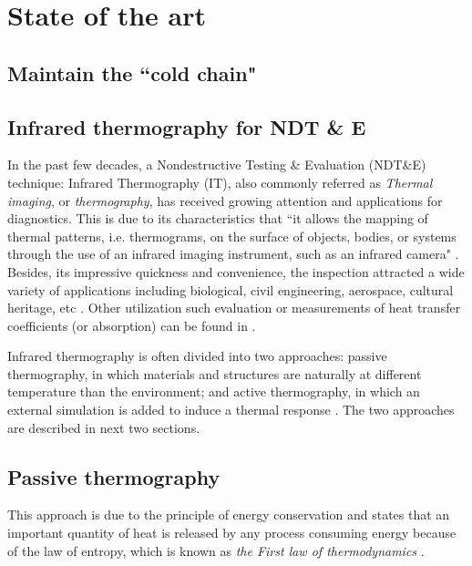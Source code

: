 \chapter{State of the art}     %
\section*{Maintain the ``cold chain"}


\section*{Infrared thermography for NDT \& E}

In the past few decades, a Nondestructive Testing \& Evaluation (NDT\&E) technique: Infrared Thermography (IT), also commonly referred as \textit{Thermal imaging}, or \textit{thermography}, has received growing attention and applications for diagnostics. This is due to its characteristics that ``it allows the mapping of thermal patterns, i.e. thermograms, on the surface of objects, bodies, or systems through the use of an infrared imaging instrument, such as an infrared camera" \citep{maldague3introduction}. Besides, its impressive quickness and convenience, the inspection attracted a wide variety of applications including biological, civil engineering, aerospace, cultural heritage, etc \citep{2007-Ibarra-Castanedo,2000-Li,cielo1987thermographie,shoja2011inspection,pradere2009microscale,avdelidis2004applications,maierhofer2005quantitative}. Other utilization such evaluation or measurements of heat transfer coefficients (or absorption) can be found in \citep{dragano2009experimental,grinzato2010r,grinzatoquality,grinzato1comparison,rossi2009k}.

Infrared thermography is often divided into two approaches: passive thermography, in which materials and structures are naturally at different temperature than the environment; and active thermography, in which an external simulation is added to induce a thermal response \citep{Maldague2001theory}. The two approaches are described in next two sections.
\section{Passive thermography}
This approach is due to the principle of energy conservation and states that an important quantity of heat is released by any process consuming energy because of the law of entropy, which is known as \textit{the First law of thermodynamics} \citep{thdy1}. 


